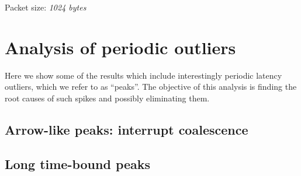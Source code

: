 \documentclass{article}
\begin{document}
\noindent
Packet size: \textit{1024 bytes}


\section*{Analysis of periodic outliers}
Here we show some of the results which include interestingly periodic latency 
outliers, which we refer to as ``peaks''. The objective of this analysis is finding
the root causes of such spikes and possibly eliminating them.

\subsection*{Arrow-like peaks: interrupt coalescence}


\subsection*{Long time-bound peaks}
\end{document}
